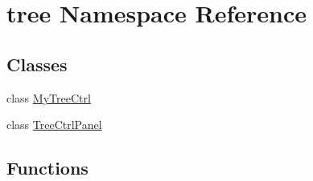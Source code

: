 \hypertarget{namespacetree}{
\section{tree Namespace Reference}
\label{namespacetree}
}
\subsection*{Classes}
\begin{DoxyCompactItemize}
\item 
class \hyperlink{classtree_1_1MyTreeCtrl}{MyTreeCtrl}
\item 
class \hyperlink{classtree_1_1TreeCtrlPanel}{TreeCtrlPanel}
\end{DoxyCompactItemize}
\subsection*{Functions}
